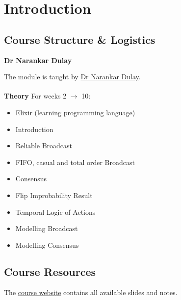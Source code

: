 \chapter{Introduction}

\section{Course Structure \& Logistics}
\begin{center}
    \centerline{\textbf{Dr Narankar Dulay}}
\end{center}
The module is taught by \href{http://wp.doc.ic.ac.uk/nd/}{Dr Narankar Dulay}.
\\
\\ \textbf{Theory} For weeks 2 $\to$ 10:
\begin{itemize}
    \item Elixir (learning programming language)
    \item Introduction
    \item Reliable Broadcast
    \item FIFO, casual and total order Broadcast
    \item Consensus
    \item Flip Improbability Result
    \item Temporal Logic of Actions
    \item Modelling Broadcast
    \item Modelling Consensus
\end{itemize}

\section{Course Resources}
The \href{https://www.doc.ic.ac.uk/~nd/dal/}{course website} contains all available slides and notes.

